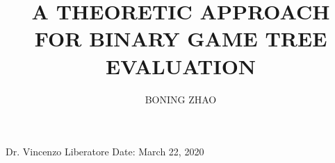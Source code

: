 \documentclass[help,12pt,onepage,reqno]{input/CWRU-Thesis}
\author{\uppercase{Boning Zhao}}
\title{A THEORETIC APPROACH FOR BINARY GAME TREE EVALUATION}
\begin{document}

\setprotcode \font
{\it \setprotcode \font}
{\bf \setprotcode \font}
{\bf \it \setprotcode \font}


\frontmatter

\maketitle		

\signaturepage
{Dr. Vincenzo Liberatore}\newline
\newline
{Date: March 22, 2020}



%

\tableofcontents
\listoffigures		

\acknowledgements


\abstract
 

\mainmatter             
{} 

\end{document}
